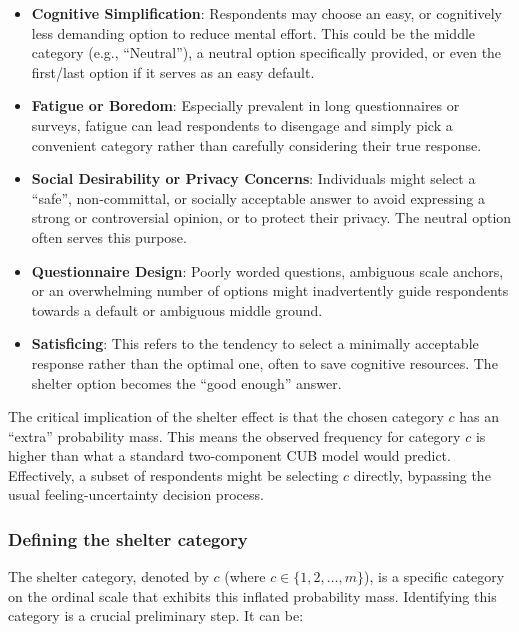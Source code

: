 \documentclass[
  letterpaper,
  DIV=11,
  numbers=noendperiod]{scrartcl}
\begin{document}
\begin{itemize}
\item
  \textbf{Cognitive Simplification}: Respondents may choose an easy, or
  cognitively less demanding option to reduce mental effort. This could
  be the middle category (e.g., ``Neutral''), a neutral option
  specifically provided, or even the first/last option if it serves as
  an easy default.
\item
  \textbf{Fatigue or Boredom}: Especially prevalent in long
  questionnaires or surveys, fatigue can lead respondents to disengage
  and simply pick a convenient category rather than carefully
  considering their true response.
\item
  \textbf{Social Desirability or Privacy Concerns}: Individuals might
  select a ``safe'', non-committal, or socially acceptable answer to
  avoid expressing a strong or controversial opinion, or to protect
  their privacy. The neutral option often serves this purpose.
\item
  \textbf{Questionnaire Design}: Poorly worded questions, ambiguous
  scale anchors, or an overwhelming number of options might
  inadvertently guide respondents towards a default or ambiguous middle
  ground.
\item
  \textbf{Satisficing}: This refers to the tendency to select a
  minimally acceptable response rather than the optimal one, often to
  save cognitive resources. The shelter option becomes the ``good
  enough'' answer.
\end{itemize}

The critical implication of the shelter effect is that the chosen
category \(c\) has an ``extra'' probability mass. This means the
observed frequency for category \(c\) is higher than what a standard
two-component CUB model would predict. Effectively, a subset of
respondents might be selecting \(c\) directly, bypassing the usual
feeling-uncertainty decision process.

\hypertarget{defining-the-shelter-category}{%
\subsubsection{Defining the shelter
category}\label{defining-the-shelter-category}}

The shelter category, denoted by \(c\) (where \(c \in \{1,2,…,m\}\)), is
a specific category on the ordinal scale that exhibits this inflated
probability mass. Identifying this category is a crucial preliminary
step. It can be:
\end{document}
